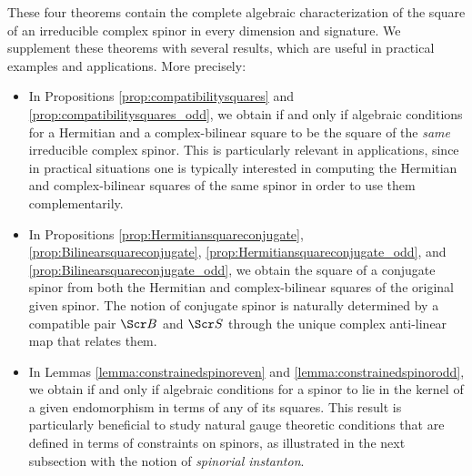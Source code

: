 \documentclass[10pt,a4paper,twoside,reqno]{amsart}
\theoremstyle{plain}
\theoremstyle{definition}
\theoremstyle{remark}
\def\scB{\Scr B}
\def\scS{\Scr S}
\begin{document}
\noindent
These four theorems contain the complete algebraic characterization of the square of an irreducible complex spinor in every dimension and signature. We supplement these theorems with several results, which are useful in practical examples and applications. More precisely:
\begin{itemize}
\item In Propositions \ref{prop:compatibilitysquares} and \ref{prop:compatibilitysquares_odd}, we obtain if and only if algebraic conditions for a Hermitian and a complex-bilinear square to be the square of the \emph{same} irreducible complex spinor. This is particularly relevant in applications, since in practical situations one is typically interested in computing the Hermitian and complex-bilinear squares of the same spinor in order to use them complementarily.

\item In Propositions \ref{prop:Hermitiansquareconjugate}, \ref{prop:Bilinearsquareconjugate}, \ref{prop:Hermitiansquareconjugate_odd}, and \ref{prop:Bilinearsquareconjugate_odd}, we obtain the square of a conjugate spinor from both the Hermitian and complex-bilinear squares of the original given spinor. The notion of conjugate spinor is naturally determined by a compatible pair $\scB$ and $\scS$ through the unique complex anti-linear map that relates them. 

\item In Lemmas \ref{lemma:constrainedspinoreven} and \ref{lemma:constrainedspinorodd}, we obtain if and only if algebraic conditions for a spinor to lie in the kernel of a given endomorphism in terms of any of its squares. This result is particularly beneficial to study natural gauge theoretic conditions that are defined in terms of constraints on spinors, as illustrated in the next subsection with the notion of \emph{spinorial instanton}. 
\end{itemize}
\end{document}
